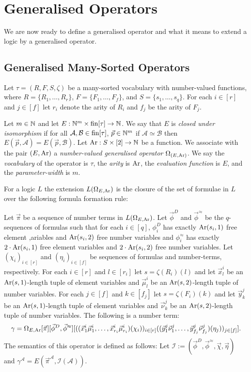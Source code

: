 \documentclass[../main/thesis.tex]{subfiles}
\begin{document}
\section{Generalised Operators}
We are now ready to define a generalised operator and what it means to extend a
logic by a generalised operator.

\subsection{Generalised Many-Sorted Operators}
Let $\tau = (R, F, S, \zeta)$ be a many-sorted vocabulary with number-valued
functions, where $R = \{R_1, \ldots, R_{r}\}$, $F = \{ F_1, \ldots, F_{f} \}$,
and $S = \{s_1, \ldots, s_{q}\}$. For each $i \in [r]$ and $j \in [f]$ let $r_i$
denote the arity of $R_i$ and $f_j$ be the arity of $F_j$.

Let $m \in \mathbb{N}$ and let $E : \mathbb{N}^{m} \times \text{\upshape fin}[\tau] \rightarrow \mathbb{N}$. We say
that $E$ is \emph{closed under isomorphism} if for all $\mathcal{A}, \mathcal{B}
\in \text{\upshape fin}[\tau]$, $\vec{p} \in \mathbb{N}^{m}$ if $\mathcal{A} \simeq \mathcal{B}$
then $E(\vec{p}, \mathcal{A}) = E(\vec{p}, \mathcal{B})$. Let $\text{\upshape Ar} : S \times
[2] \rightarrow \mathbb{N}$ be a function. We associate with the pair $(E, \text{\upshape Ar})$ a
\emph{number-valued generalised operator} $\Omega_{(E, \text{\upshape Ar})}$. We say the
\emph{vocabulary} of the operator is $\tau$, the \emph{arity} is $\text{\upshape Ar}$, the
\emph{evaluation function} is $E$, and the \emph{parameter-width} is $m$.

For a logic $L$ the extension $L(\Omega_{E, \text{\upshape Ar}})$ is the closure of the set of
formulae in $L$ over the following formula formation rule:

Let $\vec{\pi}$ be a sequence of number terms in $L(\Omega_{E, \text{\upshape Ar}})$. Let
$\vec{\phi}^D$ and $\vec{\phi}^{\approx}$ be the $q$-sequences of formulas such
that for each $i \in [q]$, $\phi^D_i$ has exactly $\text{\upshape Ar}(s_i, 1)$ free element
,ariables and $\text{\upshape Ar}(s_i, 2)$ free number variables and $\phi^{\approx}_i$ has
exactly $2\cdot\text{\upshape Ar}(s_i, 1)$ free element variables and $2\cdot\text{\upshape Ar}(s_i, 2)$ free
number variables. Let $(\chi_i)_{i \in [r]}$ and $(\eta_i)_{i \in [f]}$ be
sequences of formulas and number-terms, respectively. For each $i \in [r]$ and
$l \in [r_i]$ let $s = \zeta (R_i)(l)$ and let $\vec{x}^i_l$ be an $\text{\upshape Ar}(s,
1)$-length tuple of element variables and $\vec{\mu}^i_l$ be an $\text{\upshape Ar}(s,
2)$-length tuple of number variables. For each $j \in [f]$ and $k \in [f_j]$ let
$s = \zeta (F_i)(k)$ and let $\vec{y}^j_k$ be an $\text{\upshape Ar}(s, 1)$-length tuple of
element variables and $\vec{\nu}^j_k$ be an $\text{\upshape Ar}(s, 2)$-length tuple of number
variables. The following is a number term:
\begin{align*}
  \gamma = \Omega_{E, \text{\upshape Ar}} [\vec{\pi}] [\vec{\phi}^D, \vec{\phi}^{\approx}]  [((\vec{x}^i_1 \vec{\mu}^i_1, \ldots, \vec{x}^i_{r_i} \vec{\mu}^i_{r_i})(\chi_i))_{i \in [r]}((\vec{y}^j_1 \vec{\nu}^j_1, \ldots, \vec{y}^j_{f_j} \vec{\nu}^j_{f_j})(\eta_j))_{j \in [f]}].
\end{align*}
The semantics of this operator is defined as follows: Let $\mathcal{I} :=
(\vec{\phi}^D, \vec{\phi}^{\approx}, \vec{\chi}, \vec{\eta})$ and
$\gamma^{\mathcal{A}} = E(\vec{\pi}^{\mathcal{A}}, \mathcal{I}(\mathcal{A}))$.
\end{document}
